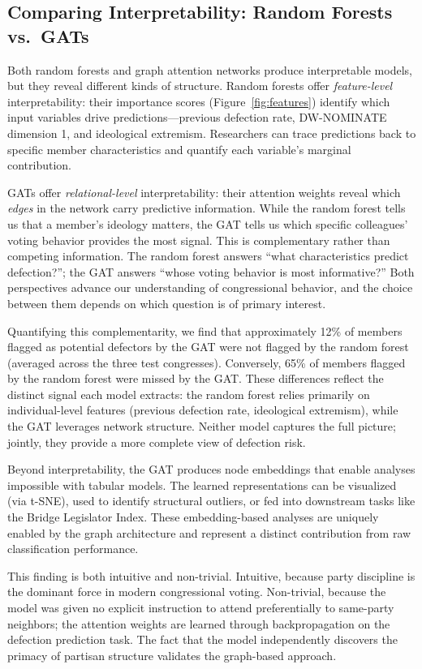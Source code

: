 \documentclass[11pt]{article}
\begin{document}
\subsection{Comparing Interpretability: Random Forests vs.\ GATs}

Both random forests and graph attention networks produce interpretable models, but they reveal different kinds of structure. Random forests offer \emph{feature-level} interpretability: their importance scores (Figure~\ref{fig:features}) identify which input variables drive predictions---previous defection rate, DW-NOMINATE dimension 1, and ideological extremism. Researchers can trace predictions back to specific member characteristics and quantify each variable's marginal contribution.

GATs offer \emph{relational-level} interpretability: their attention weights reveal which \emph{edges} in the network carry predictive information. While the random forest tells us that a member's ideology matters, the GAT tells us which specific colleagues' voting behavior provides the most signal. This is complementary rather than competing information. The random forest answers ``what characteristics predict defection?''; the GAT answers ``whose voting behavior is most informative?'' Both perspectives advance our understanding of congressional behavior, and the choice between them depends on which question is of primary interest.

Quantifying this complementarity, we find that approximately 12\% of members flagged as potential defectors by the GAT were not flagged by the random forest (averaged across the three test congresses). Conversely, 65\% of members flagged by the random forest were missed by the GAT. These differences reflect the distinct signal each model extracts: the random forest relies primarily on individual-level features (previous defection rate, ideological extremism), while the GAT leverages network structure. Neither model captures the full picture; jointly, they provide a more complete view of defection risk.

Beyond interpretability, the GAT produces node embeddings that enable analyses impossible with tabular models. The learned representations can be visualized (via t-SNE), used to identify structural outliers, or fed into downstream tasks like the Bridge Legislator Index. These embedding-based analyses are uniquely enabled by the graph architecture and represent a distinct contribution from raw classification performance.

This finding is both intuitive and non-trivial. Intuitive, because party discipline is the dominant force in modern congressional voting. Non-trivial, because the model was given no explicit instruction to attend preferentially to same-party neighbors; the attention weights are learned through backpropagation on the defection prediction task. The fact that the model independently discovers the primacy of partisan structure validates the graph-based approach.
\end{document}

